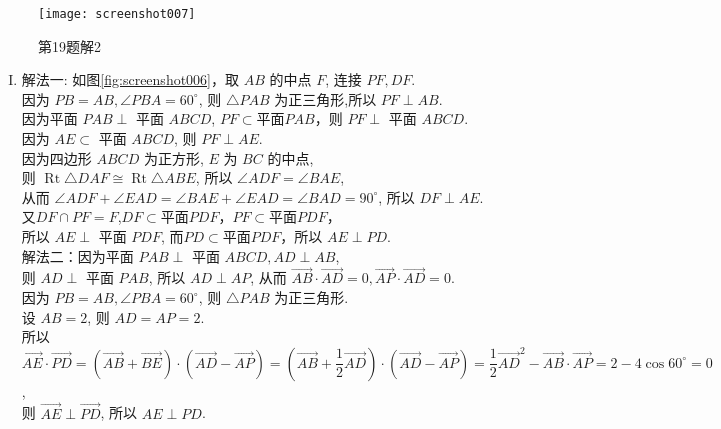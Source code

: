 \documentclass[11pt]{article}
\begin{document}
\begin{enumerate}
\begin{figure}[htbp]
		\begin{minipage}{220pt}
			\centering
			\texttt{[image: screenshot007]}
			\caption{\heiti 第19题解2}
			\label{fig:screenshot007}
		\end{minipage}
	\end{figure}
	\begin{enumerate}[(I)]
		\item \heiti 解法一: \songti 如图\ref{fig:screenshot006}，取 $A B$ 的中点 $F$, 连接 $P F, D F .$
		\\因为 $P B=A B, \angle P B A=60^{\circ}$, 则 $\triangle P A B$ 为正三角形,所以 $P F \perp A B$.
		\\因为平面 $P A B \perp$ 平面 $A B C D$, $ PF \subset $平面$ PAB $，则 $P F \perp$ 平面 $A B C D$.
		\\因为 $A E \subset$ 平面 $A B C D$, 则 $P F \perp A E$. 
		\\因为四边形 $A B C D$ 为正方形, $E$ 为 $B C$ 的中点, \\则
		$\operatorname{Rt} \triangle D A F \cong \operatorname{Rt} \triangle A B E$, 所以 $\angle A D F=\angle B A E$,
		\\从而 $\angle A D F+\angle E A D=\angle B A E+\angle E A D=\angle B A D=90^{\circ}$,
		所以 $D F \perp A E$. 
		\\又$ DF\cap PF=F $,$ DF\subset  $平面$ PDF $，$ PF\subset  $平面$ PDF $，
		\\所以$  $ $A E \perp$ 平面 $P D F$, 而$ PD\subset $平面$ PDF $，所以 $A E \perp P D . $
		\\ \heiti 解法二：\songti 因为平面 $P A B \perp$ 平面 $A B C D, A D \perp A B$, 
		\\则
		$A D \perp$ 平面 $P A B$, 所以 $A D \perp A P$, 从而 $\overrightarrow{A B} \cdot \overrightarrow{A D}=0, \overrightarrow{A P} \cdot \overrightarrow{A D}=0$.
		\\因为 $P B=A B, \angle P B A=60^{\circ}$, 则 $\triangle P A B$ 为正三角形.
		\\设 $A B=2$, 则 $A D=A P=2$.
		\\所以 $\overrightarrow{A E} \cdot \overrightarrow{P D}=(\overrightarrow{A B}+\overrightarrow{B E}) \cdot(\overrightarrow{A D}-\overrightarrow{A P})=\left(\overrightarrow{A B}+\dfrac{1}{2} \overrightarrow{A D}\right) \cdot(\overrightarrow{A D}-\overrightarrow{A P})=\dfrac{1}{2} \overrightarrow{A D}^{2}-\overrightarrow{A B} \cdot \overrightarrow{A P}=2-4 \cos 60^{\circ}=0$,
		\\则 $\overrightarrow{A E} \perp \overrightarrow{P D}$, 所以 $A E \perp P D$.

\end{enumerate}
\end{enumerate}
\end{document}

